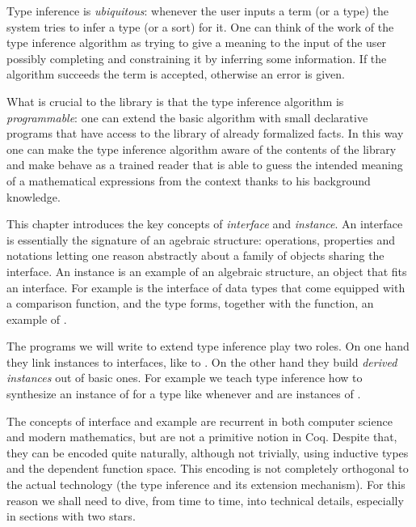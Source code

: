 Type inference is \emph{ubiquitous}: whenever the user inputs a term
(or a type) the system tries to infer a type (or
a sort) for it.  One can think of the work of the type inference
algorithm as trying to give a meaning to the input of the
user possibly completing and constraining it by inferring some
information.  If the algorithm succeeds the term is accepted,
otherwise an error is given.

What is crucial to the \mcbMC{} library is that the
type inference algorithm is \emph{programmable}: one can extend the
basic algorithm with small declarative programs that have access to
the library of already formalized facts.  In this way one can make the
type inference algorithm aware of the contents of the library and
make \Coq{} behave as a trained reader that is able to guess the
intended meaning of a mathematical expressions from the context
thanks to his background knowledge.

This chapter introduces the key concepts of \emph{interface}
and \emph{instance}.  An interface is essentially the signature
of an agebraic structure: operations, properties and notations
letting one reason abstractly about a family of objects sharing
the interface.
An instance is an example of an algebraic structure,
an object that fits an interface.
For example  is the interface of
data types that come equipped with a comparison function, and
the type  forms, together with the  function, an
example of .

The programs we will write to
extend type inference play two roles.  On one hand they link
instances to interfaces, like  to .
On the other hand they build \emph{derived
instances} out of basic ones.  For example we teach type inference
how to synthesize an instance of  for a type like
 whenever  and  are instances of .

The concepts of interface and example are recurrent in
both computer science and modern mathematics, but are not a primitive
notion in Coq.  Despite that, they can be encoded quite naturally,
although not trivially, using inductive types and the dependent function
space.   This encoding is not completely orthogonal to the
actual technology (the type inference and its extension mechanism).
For this reason we shall need to dive, from time to time, into
technical details, especially in sections with two stars.

\mcbREQUIRE{}
\label{sec:hounif}

